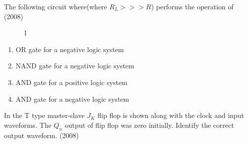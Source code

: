 
\iffalse
\chapter{2008}
\author{AI24BTECH11008}
\section{ph}
\fi

    \item The following circuit where(where $R_L>>>R$) performs the operation of \hfill (2008)
    \begin{figure}[!ht]
    \centering
    \caption{1}
    \label{fig1}
     \end{figure}
    \begin{enumerate} [label=(\Alph*)]
        \item OR gate for a negative logic system
        \item NAND gate for a negative logic system 
        \item AND gate for a positive logic system
        \item AND gate for a negative logic system
    \end{enumerate}
    \item  In the T type master-slave $J_K$ flip flop is shown along with the clock and input waveforms. The $Q_n$ output of flip flop was zero initially. Identify the correct output waveform. \hfill (2008)
     
